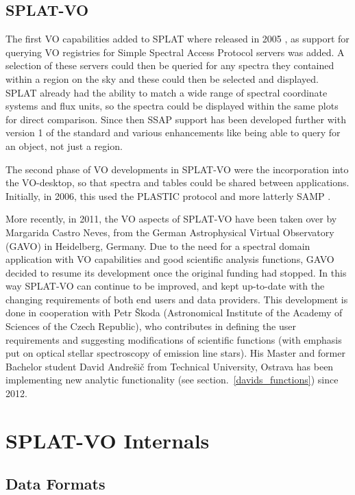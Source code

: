\documentclass[final,authoryear,5p,times,twocolumn]{elsarticle}
\begin{document}
\subsection{SPLAT-VO}

The first VO capabilities added to SPLAT where released in 2005
\citep{2005ASPC..347...22D}, as support for querying VO registries for
Simple Spectral Access Protocol servers was added. A selection of
these servers could then be queried for any spectra they contained
within a region on the sky and these could then be selected and
displayed. SPLAT already had the ability to match a wide range of
spectral coordinate systems and flux units, so the spectra could be
displayed within the same plots for direct comparison. Since then SSAP
support has been developed further with version 1 of the standard and
various enhancements like being able to query for an object, not just
a region.

The second phase of VO developments in SPLAT-VO were the incorporation
into the VO-desktop, so that spectra and tables could be shared
between applications.  Initially, in 2006, this used the PLASTIC
\citep{2007ASPC..376..511T} protocol and more latterly SAMP
\citep{2012ASPC..461..279T}.

More recently, in 2011, the VO aspects of SPLAT-VO have been taken over by Margarida
Castro Neves, from the German Astrophysical Virtual Observatory (GAVO) in
Heidelberg, Germany.  Due to the need for a spectral domain application with
VO capabilities and good scientific analysis functions, GAVO  decided to resume
its development once the original funding had stopped. In this way SPLAT-VO can
continue to be improved, and kept up-to-date with the changing requirements of
both end users and data providers.  This development  is done in cooperation
with Petr \v{S}koda (Astronomical Institute of the Academy of Sciences of the
Czech Republic), who contributes in defining the user requirements and
suggesting modifications of scientific functions (with emphasis put on optical
stellar spectroscopy of  emission line stars).  His Master and former
Bachelor student David Andre\v{s}i\v{c} from Technical University, Ostrava has been
implementing new analytic functionality (see section.~\ref{davids_functions}) since 2012.

\section{SPLAT-VO Internals}

\subsection{Data Formats}
\end{document}
